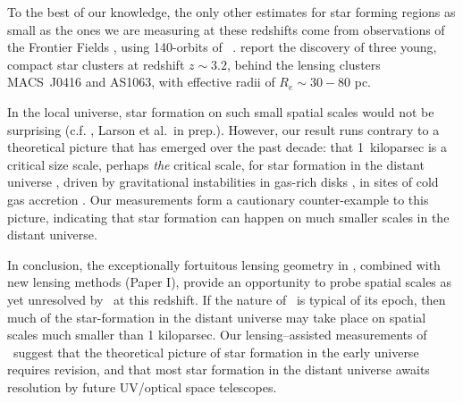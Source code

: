 To the best of our knowledge, the only other estimates for star
forming regions as small as the ones we are measuring at these
redshifts come from observations of the Frontier Fields \citep{Lotz:2017ic}, 
using 140-orbits of \hst\ .
\citet{Vanzella:2017wd,Vanzella:2017ea} report the discovery of three young, compact star clusters
at redshift $z\sim3.2$, behind the lensing clusters MACS~J0416 and AS1063, 
with effective radii of $R_e \sim30-80$ pc.

In the local universe, star formation on such small spatial scales
would not be surprising (c.f. \citealt{Liu:2013fw},  Larson et al.\ in prep.). 
However, our result runs contrary to a theoretical picture that has emerged over the past decade: 
that 1~kiloparsec is a critical size scale, perhaps {\it the} critical scale, for 
star formation in the distant universe 
\citep{Elmegreen:2005fv, Elmegreen:2007id, Elmegreen:2009kd, ForsterSchreiber:2011by, 
Guo:2011cn, Guo:2015dr}, driven by gravitational instabilities in gas-rich disks 
\citep{Toomre:1964fe, Noguchi:1999gm, Genzel:2011cp},
in sites of cold gas accretion \citep{Keres:2005gb, Dekel:2006cn, Brooks:2009bm}.
Our measurements form a cautionary counter-example to this picture,
indicating that star formation can happen on much smaller scales in the distant universe.


In conclusion, the exceptionally fortuitous lensing geometry in \arcname,
combined with new lensing methods (Paper I), 
provide an opportunity to probe spatial scales as yet
unresolved by \hst\ at this redshift.
If the nature of \arcname\ is typical of its epoch,
then much of the star-formation in the distant universe may 
take place on spatial scales much smaller than 1 kiloparsec. 
Our lensing--assisted measurements of \arcname\ 
suggest that the theoretical picture of star formation in the early universe 
requires revision,  and that most star formation in the distant universe awaits 
resolution by  future UV/optical space telescopes.
 



